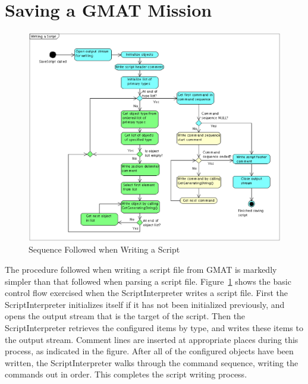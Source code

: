 \section{\label{section:WritingScript}Saving a GMAT Mission}

\begin{figure}[tb]
\begin{center}
\includegraphics[scale=0.5]{Images/WritingaScript.eps}
\caption{\label{figure:WritingScriptFlow}Sequence Followed when Writing a Script}
\end{center}
\end{figure}

The procedure followed when writing a script file from GMAT is markedly simpler than that followed
when parsing a script file.  Figure~\ref{figure:WritingScriptFlow} shows the basic control flow
exercised when the ScriptInterpreter writes a script file.  First the ScriptInterpreter
initializes itself if it has not been initialized previously, and opens the output stream that is
the target of the script.  Then the ScriptInterpreter retrieves the configured items by type, and
writes these items to the output stream.  Comment lines are inserted at appropriate places during
this process, as indicated in the figure.  After all of the configured objects have been written,
the ScriptInterpreter walks through the command sequence, writing the commands out in order.  This
completes the script writing process.


